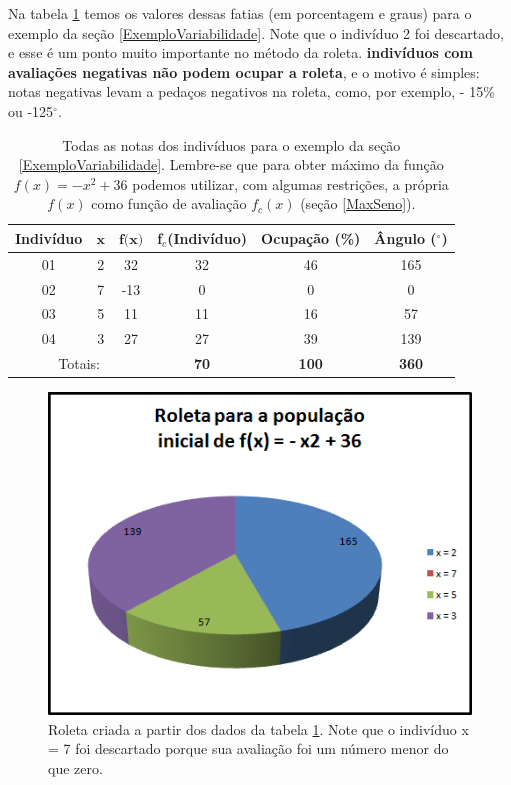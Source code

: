 	Na tabela \ref{tabSumFitness} temos os valores dessas fatias (em porcentagem e graus) para o exemplo da seção \ref{ExemploVariabilidade}. Note que o indivíduo 2 foi descartado, e esse é um ponto muito importante no método da roleta. \textbf{indivíduos com avaliações negativas não podem ocupar a roleta}, e o motivo é simples: notas negativas levam a pedaços negativos na roleta, como, por exemplo, - 15\% ou -125$^\circ$.
		
	\begin{table}[htp]		
		\caption{\label{tabSumFitness}Todas as notas dos indivíduos para o exemplo da seção \ref{ExemploVariabilidade}. Lembre-se que para obter máximo da função $f(x) = -x^2 + 36$ podemos utilizar, com algumas restrições, a própria $f(x)$ como função de avaliação $f_c(x)$ (seção \ref{MaxSeno}).}
		\begin{center}
			\begin{tabular}{c|c|c|c|c|c}
				\hline
				\textbf{Indivíduo}	& $\textbf{x}$		& $\textbf{f(x)}$	& \textbf{f$_c$(Indivíduo)} & \textbf{Ocupação (\%)} & \textbf{Ângulo ($^\circ$)} \\
				\hline
				01	& 2	& 32  & 32 	& 46	& 165 						\\
				02	& 7	& -13 & 0		& 0		& 0						\\
				03	&	5	& 11	& 11	& 16	& 57						\\	
				04	&	3	& 27	& 27	& 39	& 139						\\
				\hline
				\multicolumn{3}{c|}{Totais:}  & \textbf{70} & \textbf{100} & \textbf{360} \\
				\hline
			\end{tabular}
		\end{center}
	\end{table}
	
	
	\begin{figure}[htp]
		\begin{center}
			\includegraphics[width=13cm]{figs/ga/roleta_viciada.png}
		\end{center}
		\caption{\label{figRoleta}Roleta criada a partir dos dados da tabela \ref{tabSumFitness}. Note que o indivíduo x = 7 foi descartado porque sua avaliação foi um número menor do que zero.}
	\end{figure}
	
